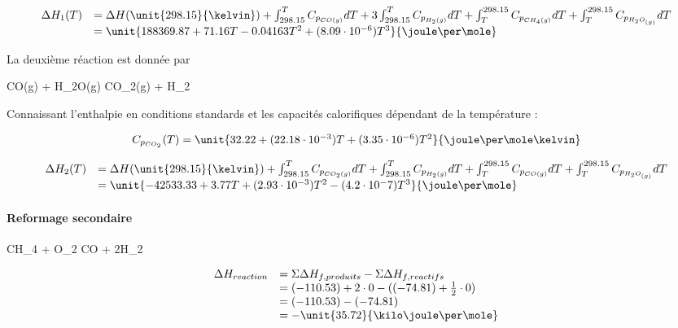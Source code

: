 $$
	\begin{array}{rl}
		 	\Delta H_1(T) &= \Delta H(\unit{298.15}{\kelvin})  
										+ \int_{298.15}^{T} C_{p_{CO(g)}} dT + 3\int_{298.15}^{T} C_{p_{H_2(g)}} dT 
											+  \int_{T}^{298.15} C_{p_{CH_4(g)}} dT + \int_{T}^{298.15}C_{p_{H_{2}O_{(g)}}}dT\\
										&=  \unit{188369.87 + 71.16 T -0.04163 T^2 + (8.09\cdot 10^{-6}) T^3}{\joule\per\mole} %
	\end{array}
$$	

La deuxième réaction est donnée par 
\begin{chemmath} 
	CO(g) + H_{2}O(g) \Leftrightarrow CO_2(g) + H_2
\end{chemmath} 

Connaissant l'enthalpie en conditions standards \cite{atkins} et les capacités calorifiques dépendant de la température \cite{hc-table}:

$$
\begin{array}{rl}
C_{p_{CO_2}}(T) = \unit{32.22 +(22.18 \cdot 10^{-3})T + (3.35 \cdot 10^{-6})T^2}{\joule\per\mole\kelvin} \\
\end{array}
$$

$$
	\begin{array}{rl}
		  \Delta H_2(T)	&=   \Delta H(\unit{298.15}{\kelvin}) 
											 + \int_{298.15}^{T} C_{p_{CO_2(g)}} dT + \int_{298.15}^{T} C_{p_{H_2(g)}} dT 
											 +  \int_{T}^{298.15} C_{p_{CO(g)}} dT + \int_{T}^{298.15}C_{p_{H_{2}O_{(g)}}}dT \\
										&=  \unit{-42533.33+3.77T+(2.93\cdot 10^{-3})T^2-(4.2\cdot 10^-7)T^3}{\joule\per\mole}
	\end{array}
$$	

\paragraph{Reformage secondaire}

\begin{chemmath}
		CH_4 + O_2 \Longrightarrow CO + 2H_2
\end{chemmath}

$$
	\begin{array}{rl}
	\Delta H_{reaction}		&= \Sigma \Delta H_{f,produits} - \Sigma \Delta H_{f,reactifs}\\
												&= (-110.53) + 2\cdot 0 - ((-74.81) + \frac{1}{2}\cdot 0)\\
												&=  (-110.53) - (-74.81)\\
												&=  -\unit{35.72}{\kilo\joule\per\mole}
	\end{array}
$$

